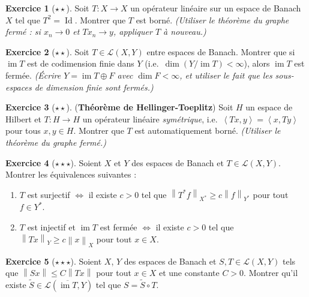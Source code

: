 \documentclass[a4paper,12pt]{book}
\DeclareMathOperator{\im}{im}
\DeclareMathOperator{\Id}{Id}
\newcommand{\norm}[1]{\left\| #1 \right\|}
\newcommand{\inner}[2]{\left\langle #1, #2 \right\rangle}
\theoremstyle{definition}
\newtheorem{exercice}{Exercice}[chapter]
\theoremstyle{plain}
\theoremstyle{remark}
\begin{document}
\begin{exercice}[$\star\star$]
\label{exo:operateur-involutif}
Soit $T : X \to X$ un opérateur linéaire sur un espace de Banach $X$
tel que $T^2 = \Id$. Montrer que $T$ est borné.
\textit{(Utiliser le théorème du graphe fermé : si $x_n \to 0$ et $Tx_n \to y$,
appliquer $T$ à nouveau.)}
\end{exercice}

\begin{exercice}[$\star\star$]
\label{exo:image-fermee-codimension}
Soit $T \in \mathcal{L}(X,Y)$ entre espaces de Banach.
Montrer que si $\im T$ est de codimension finie
dans $Y$ (i.e.\ $\dim(Y/\im T) < \infty$), alors $\im T$ est fermée.
\textit{(Écrire $Y = \im T \oplus F$ avec $\dim F < \infty$, et utiliser
le fait que les sous-espaces de dimension finie sont fermés.)}
\end{exercice}

\begin{exercice}[$\star\star$]
\label{exo:Hellinger-Toeplitz}
(\textbf{Théorème de Hellinger-Toeplitz})
Soit $H$ un espace de Hilbert et $T : H \to H$
un opérateur linéaire \emph{symétrique}, i.e.\
$\inner{Tx}{y} = \inner{x}{Ty}$ pour tous $x, y \in H$. Montrer que $T$
est automatiquement borné.
\textit{(Utiliser le théorème du graphe fermé.)}
\end{exercice}

\begin{exercice}[$\star\star\star$]
\label{exo:inverse-automatique}
Soient $X$ et $Y$ des espaces de Banach et $T \in \mathcal{L}(X,Y)$.
Montrer les équivalences suivantes :
\begin{enumerate}[label=(\alph*)]
  \item $T$ est surjectif $\iff$ il existe $c > 0$ tel que $\norm{T^*f}_{X^*} \geq c\norm{f}_{Y^*}$ pour tout $f \in Y^*$.
  \item $T$ est injectif et $\im T$ est fermée $\iff$ il existe $c > 0$ tel que $\norm{Tx}_Y \geq c\norm{x}_X$ pour tout $x \in X$.
\end{enumerate}
\end{exercice}

\begin{exercice}[$\star\star\star$]
\label{exo:factorisation-application}
Soient $X$, $Y$ des espaces de Banach et $S, T \in \mathcal{L}(X,Y)$
tels que $\norm{Sx} \leq C \norm{Tx}$ pour tout $x \in X$ et une constante
$C > 0$. Montrer qu'il existe $\tilde{S} \in \mathcal{L}(\overline{\im T}, Y)$
tel que $S = \tilde{S} \circ T$.
\end{exercice}
\end{document}
